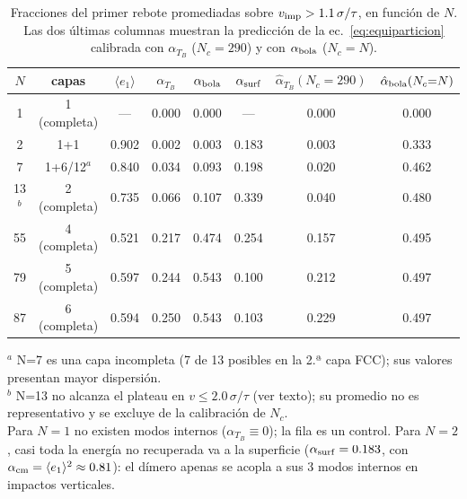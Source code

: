 \documentclass[12pt,a4paper]{article}
\begin{document}
\begin{table}[ht]
\centering
\caption{Fracciones del primer rebote promediadas sobre $v_{\rm imp}>1.1\,\sigma/\tau$,
en función de $N$. Las dos últimas columnas muestran la predicción de la
ec.~\eqref{eq:equiparticion} calibrada con $\alpha_{T_B}$ ($N_c=290$) y con
$\alpha_{\rm bola}$ ($N_c=N$).}
\label{tab:sweep_N}
\begin{tabular}{cccccccc}
\toprule
$N$ & capas & $\langle e_1\rangle$ & $\alpha_{T_B}$ & $\alpha_{\rm bola}$ &
$\alpha_{\rm surf}$ &
$\hat\alpha_{T_B}(N_c{=}290)$ & $\hat\alpha_{\rm bola}(N_c{=}N)$ \\
\midrule
 1 & 1 (completa) & — & 0.000 & 0.000 & —     & 0.000 & 0.000 \\
 2 & 1+1          & 0.902 & 0.002 & 0.003 & 0.183 & 0.003 & 0.333 \\
 7 & 1+6/12$^a$   & 0.840 & 0.034 & 0.093 & 0.198 & 0.020 & 0.462 \\
13$^b$ & 2 (completa) & 0.735 & 0.066 & 0.107 & 0.339 & 0.040 & 0.480 \\
55 & 4 (completa) & 0.521 & 0.217 & 0.474 & 0.254 & 0.157 & 0.495 \\
79 & 5 (completa) & 0.597 & 0.244 & 0.543 & 0.100 & 0.212 & 0.497 \\
87 & 6 (completa) & 0.594 & 0.250 & 0.543 & 0.103 & 0.229 & 0.497 \\
\bottomrule
\end{tabular}
\footnotesize $^a$ N=7 es una capa incompleta (7 de 13 posibles en la 2.ª capa FCC);
sus valores presentan mayor dispersión.\\
\footnotesize $^b$ N=13 no alcanza el plateau en $v\leq2.0\,\sigma/\tau$
(ver texto); su promedio no es representativo y se excluye de la
calibración de $N_c$.\\
\footnotesize Para $N=1$ no existen modos internos ($\alpha_{T_B}\equiv0$);
la fila es un control. Para $N=2$, casi toda la energía no recuperada va a
la superficie ($\alpha_{\rm surf}=0.183$, con
$\alpha_{\rm cm}=\langle e_1\rangle^2\approx0.81$): el dímero apenas se
acopla a sus 3 modos internos en impactos verticales.
\end{table}
\end{document}
